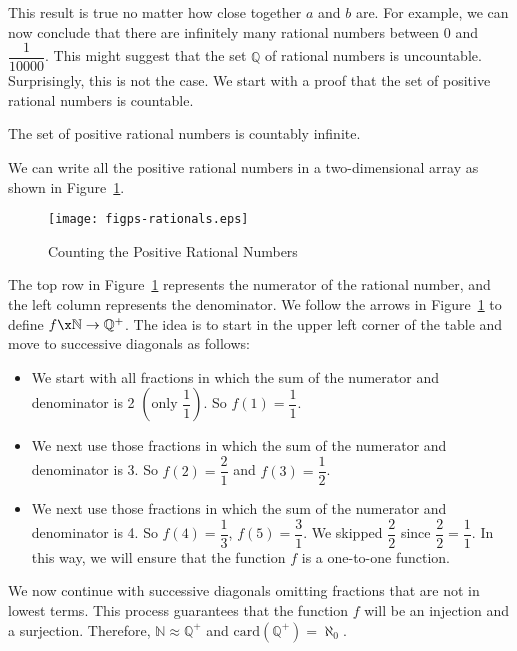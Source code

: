 This result is true no matter how close together $a$ and $b$ are.  For example, we can now conclude that there are infinitely many rational numbers between 0 and $\dfrac{1}{10000}$.  This might suggest that the set $\mathbb{Q}$ of rational numbers is uncountable.  Surprisingly, this is not the case.  We start with a proof that the set of positive rational numbers is countable.

\begin{theorem}\label{T:positiverationals}
The set of positive rational numbers is countably infinite.
\end{theorem}
%
\begin{myproof}
We can write all the positive rational numbers in a two-dimensional array as shown in 
Figure~\ref{fig:positiverationals}.
%
\begin{figure}[h]
\begin{center}
\texttt{[image: figps-rationals.eps]}
\caption{Counting the Positive Rational Numbers}\label{fig:positiverationals}
\end{center}
\end{figure}
The top row in Figure~\ref{fig:positiverationals} represents the numerator of the rational number, and the left column represents the denominator.  We follow the arrows in 
Figure~\ref{fig:positiverationals} to define $f\x \mathbb{N} \to \mathbb{Q}^+$.  The idea is to start in the upper left corner of the table and move to successive diagonals  as follows:
\begin{itemize}
\item We start with all fractions in which the sum of the numerator and denominator is 2 
$\left( \text{only } \dfrac{1}{1} \right)$.  So $f ( 1 ) = \dfrac{1}{1}$.

\item We next use those fractions in which the sum of the numerator and denominator is 3.  So 
$f ( 2 ) = \dfrac{2}{1}$ and $f ( 3 ) = \dfrac{1}{2}$.

\item We next use those fractions in which the sum of the numerator and denominator is 4.  So 
$f ( 4 ) = \dfrac{1}{3}$, $f ( 5 ) = \dfrac{3}{1}$.  We skipped 
$\dfrac{2}{2}$ since $\dfrac{2}{2} = \dfrac{1}{1}$.  In this way, we will ensure that the function $f$ is a one-to-one function.
\end{itemize}
We now continue with successive diagonals omitting fractions that are not in lowest terms.  This process guarantees that the function $f$ will be an injection and a surjection.  Therefore, 
$\mathbb{N} \approx \mathbb{Q}^+$ and $\text{card} ( \mathbb{Q}^+ ) = \aleph_0$.
\end{myproof}

